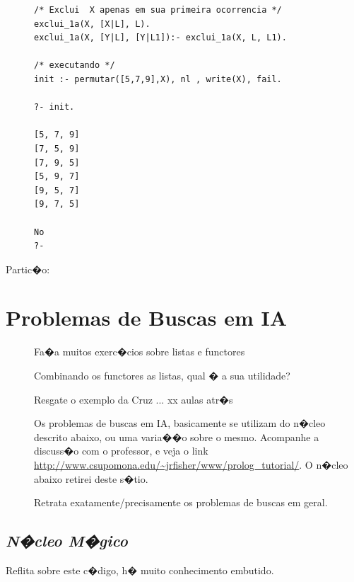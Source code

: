 \documentclass[final,a4paper]{article}
\begin{document}
\begin{description}
\begin{lstlisting}
/* Exclui  X apenas em sua primeira ocorrencia */
exclui_1a(X, [X|L], L).
exclui_1a(X, [Y|L], [Y|L1]):- exclui_1a(X, L, L1).

/* executando */
init :- permutar([5,7,9],X), nl , write(X), fail.

?- init.

[5, 7, 9]
[7, 5, 9]
[7, 9, 5]
[5, 9, 7]
[9, 5, 7]
[9, 7, 5]

No
?- 
\end{lstlisting}

\newpage
\item [Partic�o:]

\end{description}


\section{Problemas de Buscas em IA}


\begin{description}

\item [] Fa�a muitos exerc�cios sobre listas e functores

\item [] Combinando os functores as listas, qual � a sua utilidade?

\item [] Resgate o exemplo da Cruz ... xx aulas atr�s

\item [] Os problemas de buscas em  IA, basicamente se utilizam do
n�cleo descrito abaixo, ou uma varia��o sobre o
mesmo. Acompanhe a discuss�o com o professor,
e veja o link \url{http://www.csupomona.edu/~jrfisher/www/prolog_tutorial/}.
O n�cleo abaixo retirei deste s�tio. 

\item [] Retrata exatamente/precisamente os 
problemas de buscas em geral.

\end{description}

\newpage
\subsection{{\em N�cleo M�gico}}

\begin{center}
 Reflita sobre este c�digo, h� muito conhecimento
embutido.
\end{center}
\end{document}
